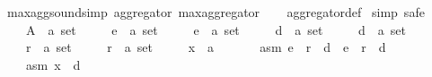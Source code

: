 \begin{isabellebody}
\ max{\isacharunderscore}{\kern0pt}agg{\isacharunderscore}{\kern0pt}sound{\isacharbrackleft}{\kern0pt}simp{\isacharbrackright}{\kern0pt}{\isacharcolon}{\kern0pt}\ {\isachardoublequoteopen}aggregator\ max{\isacharunderscore}{\kern0pt}aggregator{\isachardoublequoteclose}\isanewline
%
\isadelimproof
\ \ %
\endisadelimproof
%
\isatagproof
{}\isamarkupfalse%
\ aggregator{\isacharunderscore}{\kern0pt}def\isanewline
{}\isamarkupfalse%
\ {\isacharparenleft}{\kern0pt}simp{\isacharcomma}{\kern0pt}\ safe{\isacharparenright}{\kern0pt}\isanewline
\ \ \isamarkupfalse%
\isanewline
\ \ \ \ A\ {\isacharcolon}{\kern0pt}{\isacharcolon}{\kern0pt}\ {\isachardoublequoteopen}{\isacharprime}{\kern0pt}a\ set{\isachardoublequoteclose}\ \isanewline
\ \ \ \ e{}\ {\isacharcolon}{\kern0pt}{\isacharcolon}{\kern0pt}\ {\isachardoublequoteopen}{\isacharprime}{\kern0pt}a\ set{\isachardoublequoteclose}\ \isanewline
\ \ \ \ e{}\ {\isacharcolon}{\kern0pt}{\isacharcolon}{\kern0pt}\ {\isachardoublequoteopen}{\isacharprime}{\kern0pt}a\ set{\isachardoublequoteclose}\ \isanewline
\ \ \ \ d{}\ {\isacharcolon}{\kern0pt}{\isacharcolon}{\kern0pt}\ {\isachardoublequoteopen}{\isacharprime}{\kern0pt}a\ set{\isachardoublequoteclose}\ \isanewline
\ \ \ \ d{}\ {\isacharcolon}{\kern0pt}{\isacharcolon}{\kern0pt}\ {\isachardoublequoteopen}{\isacharprime}{\kern0pt}a\ set{\isachardoublequoteclose}\ \isanewline
\ \ \ \ r{}\ {\isacharcolon}{\kern0pt}{\isacharcolon}{\kern0pt}\ {\isachardoublequoteopen}{\isacharprime}{\kern0pt}a\ set{\isachardoublequoteclose}\ \isanewline
\ \ \ \ r{}\ {\isacharcolon}{\kern0pt}{\isacharcolon}{\kern0pt}\ {\isachardoublequoteopen}{\isacharprime}{\kern0pt}a\ set{\isachardoublequoteclose}\ \isanewline
\ \ \ \ x\ {\isacharcolon}{\kern0pt}{\isacharcolon}{\kern0pt}\ {\isachardoublequoteopen}{\isacharprime}{\kern0pt}a{\isachardoublequoteclose}\isanewline
\ \ \isamarkupfalse%
\isanewline
\ \ \ \ asm{}{\isacharcolon}{\kern0pt}\ {\isachardoublequoteopen}e{}\ {\isasymunion}\ r{}\ {\isasymunion}\ d{}\ {\isacharequal}{\kern0pt}\ e{}\ {\isasymunion}\ r{}\ {\isasymunion}\ d{}{\isachardoublequoteclose}\ \isanewline
\ \ \ \ asm{}{\isacharcolon}{\kern0pt}\ {\isachardoublequoteopen}x\ {\isasymnotin}\ d{}{\isachardoublequoteclose}\ \isanewline

\end{isabellebody}
